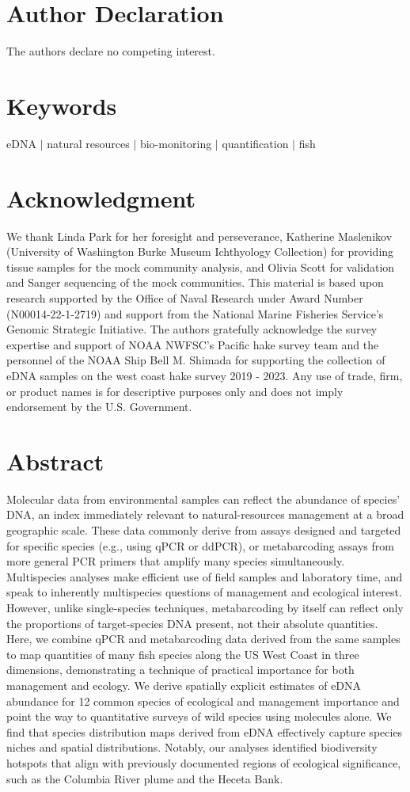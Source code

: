 \documentclass{article}
\begin{document}
\section*{Author Declaration}
The authors declare no competing interest.

\section*{Keywords}
eDNA $|$ natural resources $|$ bio-monitoring $|$ quantification $|$ fish

\section*{Acknowledgment}
We thank Linda Park for her foresight and perseverance, Katherine Maslenikov (University of Washington Burke Museum Ichthyology Collection) for providing tissue samples for the mock community analysis, and Olivia Scott for validation and Sanger sequencing of the mock communities. This material is based upon research supported by the Office of Naval Research under Award Number (N00014-22-1-2719) and support from the National Marine Fisheries Service's Genomic Strategic Initiative. The authors gratefully acknowledge the survey expertise and support of NOAA NWFSC's Pacific hake survey team and the personnel of the NOAA Ship Bell M. Shimada for supporting the collection of eDNA samples on the west coast hake survey 2019 - 2023. Any use of trade, firm, or product names is for descriptive purposes only and does not imply endorsement by the U.S. Government.

\section*{Abstract}
Molecular data from environmental samples can reflect the abundance of species’ DNA, an index immediately relevant to natural-resources management at a broad geographic scale. These data commonly derive from assays designed and targeted for specific species (e.g., using qPCR or ddPCR), or metabarcoding assays from more general PCR primers that amplify many species simultaneously. Multispecies analyses make efficient use of field samples and laboratory time, and speak to inherently multispecies questions of management and ecological interest. However, unlike single-species techniques, metabarcoding by itself can reflect only the proportions of target-species DNA present, not their absolute quantities. Here, we combine qPCR and metabarcoding data derived from the same samples to map quantities of many fish species along the US West Coast in three dimensions, demonstrating a technique of practical importance for both management and ecology. We derive spatially explicit estimates of eDNA abundance for 12 common species of ecological and management importance and point the way to quantitative surveys of wild species using molecules alone. We find that species distribution maps derived from eDNA effectively capture species niches and spatial distributions. Notably, our analyses identified biodiversity hotspots that align with previously documented regions of ecological significance, such as the Columbia River plume and the Heceta Bank.
\end{document}

